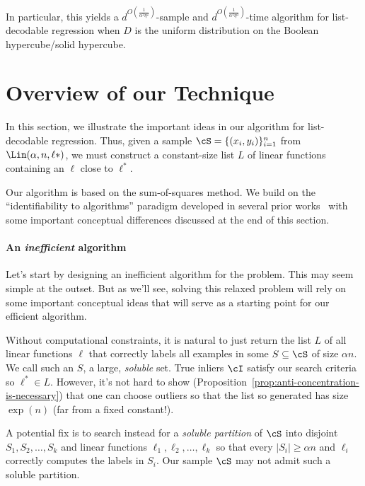 In particular, this yields a $d^{O(\frac{1}{\alpha^2 \eta^2})}$-sample and $d^{O(\frac{1}{\alpha^4 \eta^4})}$-time algorithm for list-decodable regression when $D$ is the uniform distribution on the Boolean hypercube/solid hypercube.


\section{Overview of our Technique} \label{sec:overview}
In this section, we illustrate the important ideas in our algorithm for list-decodable regression. 
Thus, given a sample $\cS = \{(x_i,y_i)\}_{i = 1}^n$ from $\Lin(\alpha,n,\ell*)$, we must construct a constant-size list $L$ of linear functions containing an $\ell$ close to $\ell^*$. 

Our algorithm is based on the sum-of-squares method. We build on the ``identifiability to algorithms'' paradigm developed in several prior works~\cite{DBLP:conf/colt/BarakM16,MR3388192-Barak15,DBLP:conf/focs/MaSS16,2017KS,HopkinsLi17,KothariSteinhardt17,DBLP:conf/colt/KlivansKM18} with some important conceptual differences discussed at the end of this section. 

\paragraph{An \emph{inefficient} algorithm} Let's start by designing an inefficient algorithm for the problem. This may seem simple at the outset. But as we'll see, solving this relaxed problem will rely on some important conceptual ideas that will serve as a starting point for our efficient algorithm. 

Without computational constraints, it is natural to just return the list $L$ of all linear functions $\ell$ that correctly labels all examples in some $S \subseteq \cS$ of size $\alpha n$. We call such an $S$, a large, \emph{soluble} set. True inliers $\cI$ satisfy our search criteria so $\ell^* \in L$. However, it's not hard to show (Proposition~\ref{prop:anti-concentration-is-necessary}) that one can choose outliers so that the list so generated has size $\exp(n)$ (far from a fixed constant!).

A potential fix is to search instead for a \emph{soluble partition} of $\cS$ into disjoint $S_1, S_2,\ldots, S_k$ and  linear functions $\ell_1, \ell_2, \ldots, \ell_k$ so that every $|S_i| \geq \alpha n$ and $\ell_i$ correctly computes the labels in $S_i$. Our sample $\cS$ may not admit such a soluble partition. 

